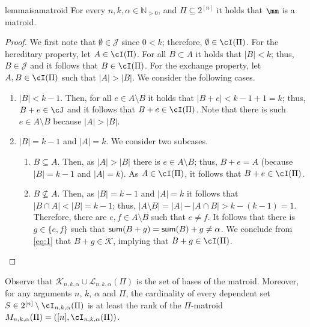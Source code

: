 \begin{restatable}{lemma}{isamatroid}
	\label{lem:1}
	For every  $n,k,\alpha \in \mathbb{N}_{>0}$, and $\Pi \subseteq 2^{[n]}$ it holds that $\mm$ is a matroid.
\end{restatable}
	\begin{proof}
	We first note that $\emptyset \in \mathcal{J}$ since $0<k$; therefore, $\emptyset \in \cI(\Pi)$. For the hereditary property, let $A \in \cI(\Pi)$. For all $B \subset A$ it holds that $|B| < k$; thus, $B \in \mathcal{J}$ and it follows that $B \in \cI(\Pi)$. For the exchange property, let $A,B \in \cI(\Pi)$ such that $|A| > |B|$. We consider the following cases. 
	\begin{enumerate}
		\item $|B| < k-1$. Then, for all $e \in A \setminus B$ it holds that $|B+e| < k-1+1 = k$; thus, $B+e \in \cJ$ and it follows that $B+e \in \cI(\Pi)$. Note that there is such $e  \in A \setminus B$ because $|A| > |B|$. 
		
		\item $|B| = k-1$ and $|A| = k$. We consider two subcases.  
		\begin{enumerate}
			\item $B \subseteq A$. Then, as $|A| > |B|$ there is $e \in A \setminus B$; thus, $B+e = A$ (because $|B| = k-1$ and $|A| = k$). As $A \in \cI(\Pi)$, it follows that $B+e \in \cI(\Pi)$.
			
			\item $B \not\subseteq A$.  Then, as $|B| = k-1$ and $|A| = k$ it follows that $|B \cap A| < |B| = k-1$; thus, $|A \setminus B| = |A|-|A \cap B| > k - (k-1) = 1$. Therefore, there are $e,f \in A \setminus B$ such that $e \neq f$. %
			It follows that there is $g \in \{e,f\}$ such that $\textnormal{\textsf{sum}}(B+g) = \textnormal{\textsf{sum}}(B)+g \neq \alpha$. We conclude from \eqref{eq:1} that $B+g \in \mathcal{K}$,
			implying that $B+g \in \cI(\Pi)$.
		\end{enumerate}
\end{enumerate}	\end{proof}
Observe that $\mathcal{K}_{n,k,\alpha} \cup \mathcal{L}_{n,k,\alpha}(\Pi)$ is the set of bases of the matroid. Moreover, for any arguments $n$, $k$, $\alpha$ and $\Pi$,
the cardinality of every  dependent set $S\in 2^{[n]}\setminus \cI_{n,k,\alpha}(\Pi)$  is at least the rank of the $\Pi$-matroid $M_{n,k,\alpha} (\Pi)=([n],\cI_{n,k,\alpha}(\Pi))$.
